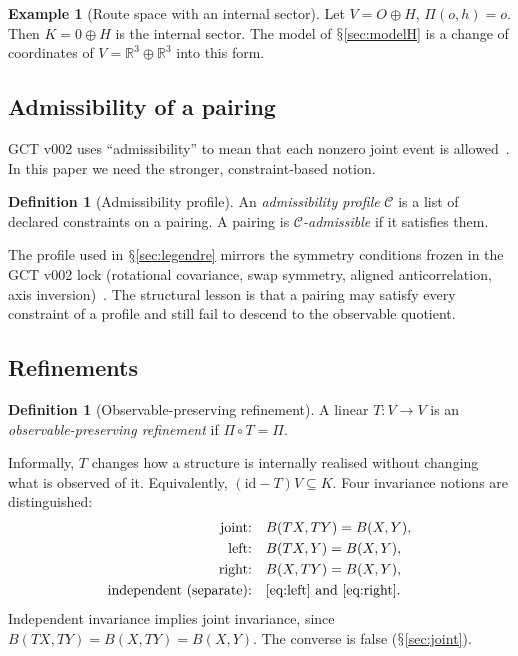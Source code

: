 \documentclass[11pt,a4paper]{article}
\renewcommand{\S}{\ensuremath{\mathsection}}
\newcommand{\RR}{\mathbb{R}}
\newcommand{\id}{\mathrm{id}}
\theoremstyle{plain}
\theoremstyle{definition}
\newtheorem{definition}[theorem]{Definition}
\newtheorem{example}[theorem]{Example}
\begin{document}
\begin{example}[Route space with an internal sector]\label{ex:internal}
Let $V=O\oplus H$, $\Pi(o,h)=o$. Then $K=0\oplus H$ is the internal sector.
The model of \S\ref{sec:modelH} is a change of coordinates of $V=\RR^3\oplus\RR^3$ into this form.
\end{example}

\subsection{Admissibility of a pairing}\label{sec:admiss}
GCT v002 uses ``admissibility'' to mean that each nonzero joint event is allowed~\cite{G3}.
In this paper we need the stronger, constraint-based notion.
\begin{definition}[Admissibility profile]
An \emph{admissibility profile} $\mathcal C$ is a list of declared constraints on a pairing.
A pairing is \emph{$\mathcal C$-admissible} if it satisfies them.
\end{definition}
The profile used in \S\ref{sec:legendre} mirrors the symmetry conditions frozen in the GCT v002 lock (rotational covariance, swap symmetry, aligned anticorrelation, axis inversion)~\cite{G2,G8}.
The structural lesson is that a pairing may satisfy every constraint of a profile and still fail to descend to the observable quotient.

\subsection{Refinements}
\begin{definition}[Observable-preserving refinement]\label{def:refine}
A linear $T\colon V\to V$ is an \emph{observable-preserving refinement} if $\Pi\circ T=\Pi$.
\end{definition}
Informally, $T$ changes how a structure is internally realised without changing what is observed of it.
Equivalently, $(\id-T)V\subseteq K$.
Four invariance notions are distinguished:
\begin{align}
\text{joint:}&\quad B(TX,TY)=B(X,Y),\label{eq:joint}\\
\text{left:}&\quad B(TX,Y)=B(X,Y),\label{eq:left}\\
\text{right:}&\quad B(X,TY)=B(X,Y),\label{eq:right}\\
\text{independent (separate):}&\quad\text{\eqref{eq:left} and \eqref{eq:right}.}\label{eq:sep}
\end{align}
Independent invariance implies joint invariance, since $B(TX,TY)=B(X,TY)=B(X,Y)$. The converse is false (\S\ref{sec:joint}).
\end{document}
